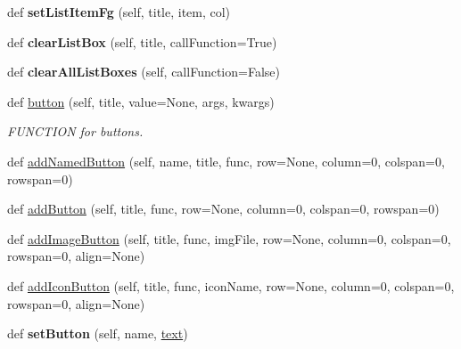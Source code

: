\begin{DoxyCompactItemize}
\item 
\mbox{\label{class_python_01_g_u_i_1_1appjar_1_1gui_aa608b43f80377ebff9cd11e08ad2e46e}} 
def {\bfseries set\+List\+Item\+Fg} (self, title, item, col)
\item 
\mbox{\label{class_python_01_g_u_i_1_1appjar_1_1gui_a5bce4b9da6ff86c92253b6163cefc4e9}} 
def {\bfseries clear\+List\+Box} (self, title, call\+Function=True)
\item 
\mbox{\label{class_python_01_g_u_i_1_1appjar_1_1gui_a9d583a92d0c5230f55128ba0c6037737}} 
def {\bfseries clear\+All\+List\+Boxes} (self, call\+Function=False)
\item 
def \hyperlink{class_python_01_g_u_i_1_1appjar_1_1gui_aa8810c60c820b8b3eb5c8647a88a1b05}{button} (self, title, value=None, args, kwargs)
\begin{DoxyCompactList}\small\item\em F\+U\+N\+C\+T\+I\+ON for buttons. \end{DoxyCompactList}\item 
def \hyperlink{class_python_01_g_u_i_1_1appjar_1_1gui_a0037b0964397da51156eaac0f625867a}{add\+Named\+Button} (self, name, title, func, row=None, column=0, colspan=0, rowspan=0)
\item 
def \hyperlink{class_python_01_g_u_i_1_1appjar_1_1gui_a3e6cc52819dd647caaaafa80c673637c}{add\+Button} (self, title, func, row=None, column=0, colspan=0, rowspan=0)
\item 
def \hyperlink{class_python_01_g_u_i_1_1appjar_1_1gui_a0eade2a8f7633d73bea99e872fce7d1f}{add\+Image\+Button} (self, title, func, img\+File, row=None, column=0, colspan=0, rowspan=0, align=None)
\item 
def \hyperlink{class_python_01_g_u_i_1_1appjar_1_1gui_a3a892e703a45ff97b22dbc7040dfb21e}{add\+Icon\+Button} (self, title, func, icon\+Name, row=None, column=0, colspan=0, rowspan=0, align=None)
\item 
\mbox{\label{class_python_01_g_u_i_1_1appjar_1_1gui_ad186394f0cc91153c6ab7238bda4b6c4}} 
def {\bfseries set\+Button} (self, name, \hyperlink{class_python_01_g_u_i_1_1appjar_1_1gui_a6a060ddfec169e464326a0dd179a559e}{text})
\item 
\mbox{\label{class_python_01_g_u_i_1_1appjar_1_1gui_ac05190240b66ae5c5a5df9e8498099c4}} 

\end{DoxyCompactItemize}
